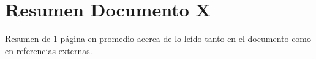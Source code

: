 \section{Resumen Documento X}
Resumen de 1 página en promedio acerca de lo leído tanto en el documento como en referencias externas.
